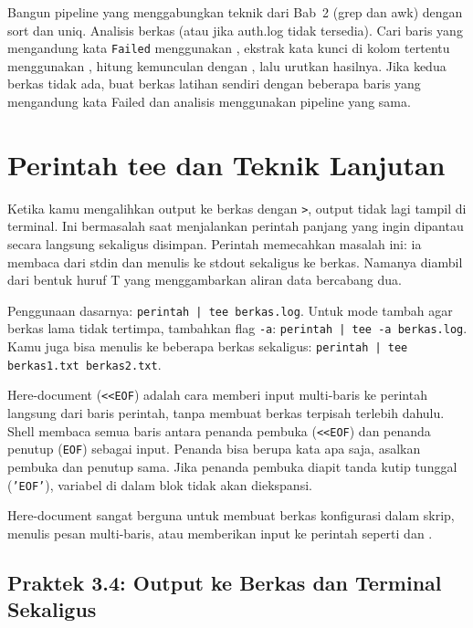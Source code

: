 \begin{challengebox}
Bangun pipeline yang menggabungkan teknik dari Bab~2 (grep dan awk) dengan sort dan uniq. Analisis berkas  (atau  jika auth.log tidak tersedia). Cari baris yang mengandung kata \texttt{Failed} menggunakan , ekstrak kata kunci di kolom tertentu menggunakan , hitung kemunculan dengan , lalu urutkan hasilnya. Jika kedua berkas tidak ada, buat berkas latihan sendiri dengan beberapa baris yang mengandung kata Failed dan analisis menggunakan pipeline yang sama.
\end{challengebox}

\section{Perintah tee dan Teknik Lanjutan}
\label{sec:tee-advanced}

Ketika kamu mengalihkan output ke berkas dengan \texttt{>}, output tidak lagi tampil di terminal. Ini bermasalah saat menjalankan perintah panjang yang ingin dipantau secara langsung sekaligus disimpan. Perintah  memecahkan masalah ini: ia membaca dari stdin dan menulis ke stdout sekaligus ke berkas. Namanya diambil dari bentuk huruf T yang menggambarkan aliran data bercabang dua.

Penggunaan dasarnya: \texttt{perintah | tee berkas.log}. Untuk mode tambah agar berkas lama tidak tertimpa, tambahkan flag \texttt{-a}: \texttt{perintah | tee -a berkas.log}. Kamu juga bisa menulis ke beberapa berkas sekaligus: \texttt{perintah | tee berkas1.txt berkas2.txt}.

Here-document (\texttt{<<EOF}) adalah cara memberi input multi-baris ke perintah langsung dari baris perintah, tanpa membuat berkas terpisah terlebih dahulu. Shell membaca semua baris antara penanda pembuka (\texttt{<<EOF}) dan penanda penutup (\texttt{EOF}) sebagai input. Penanda bisa berupa kata apa saja, asalkan pembuka dan penutup sama. Jika penanda pembuka diapit tanda kutip tunggal (\texttt{'EOF'}), variabel di dalam blok tidak akan diekspansi.

Here-document sangat berguna untuk membuat berkas konfigurasi dalam skrip, menulis pesan multi-baris, atau memberikan input ke perintah seperti  dan .

\subsection*{Praktek 3.4: Output ke Berkas dan Terminal Sekaligus}


